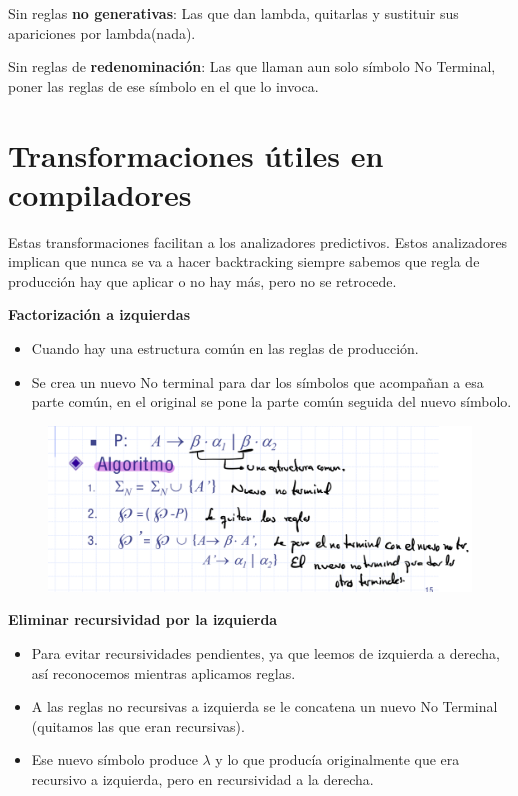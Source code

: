 \documentclass[12pt]{report} %
\begin{document}
Sin reglas \textbf{no generativas}: Las que dan lambda, quitarlas y
sustituir sus apariciones por lambda(nada).

Sin reglas de \textbf{redenominación}: Las que llaman aun solo símbolo
No Terminal, poner las reglas de ese símbolo en el que lo invoca.


\section{Transformaciones útiles en compiladores}

Estas transformaciones facilitan a los analizadores predictivos. Estos
analizadores implican que nunca se va a hacer backtracking siempre
sabemos que regla de producción hay que aplicar o no hay más, pero no se
retrocede.

\textbf{Factorización a izquierdas}

\begin{itemize}
\item
  Cuando hay una estructura común en las reglas de producción.
\item
  Se crea un nuevo No terminal para dar los símbolos que acompañan a esa
  parte común, en el original se pone la parte común seguida del nuevo
  símbolo.
\end{itemize}

\begin{figure}[H]
	{\includegraphics[scale=.3]{Untitled 1.png}}
\end{figure}

\textbf{Eliminar recursividad por la izquierda}

\begin{itemize}
\item
  Para evitar recursividades pendientes, ya que leemos de izquierda a
  derecha, así reconocemos mientras aplicamos reglas.
\item
  A las reglas no recursivas a izquierda se le concatena un nuevo No
  Terminal (quitamos las que eran recursivas).
\item
  Ese nuevo símbolo produce \(\lambda\) y lo que producía originalmente
  que era recursivo a izquierda, pero en recursividad a la derecha.
\end{itemize}
\end{document}
